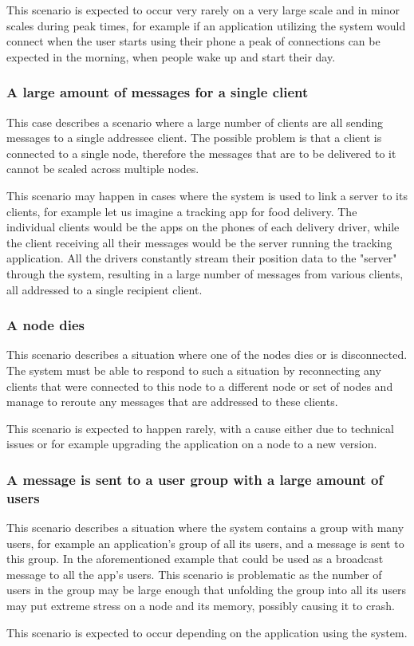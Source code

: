 This scenario is expected to occur very rarely on a very large scale and in minor scales during peak times, for example if an application utilizing the system would connect when the user starts using their phone a peak of connections can be expected in the morning, when people wake up and start their day.

\subsubsection{A large amount of messages for a single client}
This case describes a scenario where a large number of clients are all sending messages to a single addressee client. The possible problem is that a client is connected to a single node, therefore the messages that are to be delivered to it cannot be scaled across multiple nodes.

This scenario may happen in cases where the system is used to link a server to its clients, for example let us imagine a tracking app for food delivery. The individual clients would be the apps on the phones of each delivery driver, while the client receiving all their messages would be the server running the tracking application. All the drivers constantly stream their position data to the "server" through the system, resulting in a large number of messages from various clients, all addressed to a single recipient client.

\subsubsection{A node dies}
This scenario describes a situation where one of the nodes dies or is disconnected. The system must be able to respond to such a situation by reconnecting any clients that were connected to this node to a different node or set of nodes and manage to reroute any messages that are addressed to these clients.

This scenario is expected to happen rarely, with a cause either due to technical issues or for example upgrading the application on a node to a new version.

\subsubsection{A message is sent to a user group with a large amount of users}
This scenario describes a situation where the system contains a group with many users, for example an application's group of all its users, and a message is sent to this group. In the aforementioned example that could be used as a broadcast message to all the app's users. This scenario is problematic as the number of users in the group may be large enough that unfolding the group into all its users may put extreme stress on a node and its memory, possibly causing it to crash.

This scenario is expected to occur depending on the application using the system.